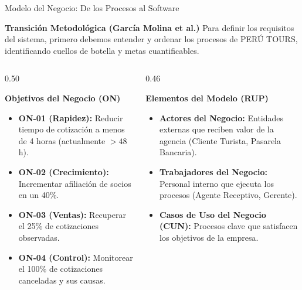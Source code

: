 \documentclass[aspectratio=169, 10pt]{beamer}
\begin{document}
\begin{frame}{Modelo del Negocio: De los Procesos al Software}
    \begin{block}{\textbf{Transición Metodológica (García Molina et al.)}}
        \small
        Para definir los requisitos del sistema, primero debemos entender y ordenar los procesos de PERÚ TOURS, identificando cuellos de botella y metas cuantificables.
    \end{block}
    \vspace{0.2cm}
    \begin{columns}[t]
        \begin{column}{0.50\textwidth}
            \begin{exampleblock}{\textbf{Objetivos del Negocio (ON)}}
                \small
                \begin{itemize}
                    \item \textbf{ON-01 (Rapidez):} Reducir tiempo de cotización a menos de 4 horas (actualmente $> 48$h).
                    \item \textbf{ON-02 (Crecimiento):} Incrementar afiliación de socios en un 40\%.
                    \item \textbf{ON-03 (Ventas):} Recuperar el 25\% de cotizaciones observadas.
                    \item \textbf{ON-04 (Control):} Monitorear el 100\% de cotizaciones canceladas y sus causas.
                \end{itemize}
            \end{exampleblock}
        \end{column}
        
        \begin{column}{0.46\textwidth}
            \begin{exampleblock}{\textbf{Elementos del Modelo (RUP)}}
                \small
                \begin{itemize}
                    \item \textbf{Actores del Negocio:} Entidades externas que reciben valor de la agencia (Cliente Turista, Pasarela Bancaria).
                    \item \textbf{Trabajadores del Negocio:} Personal interno que ejecuta los procesos (Agente Receptivo, Gerente).
                    \item \textbf{Casos de Uso del Negocio (CUN):} Procesos clave que satisfacen los objetivos de la empresa.
                \end{itemize}
            \end{exampleblock}
        \end{column}
    \end{columns}
\end{frame}
\end{document}
